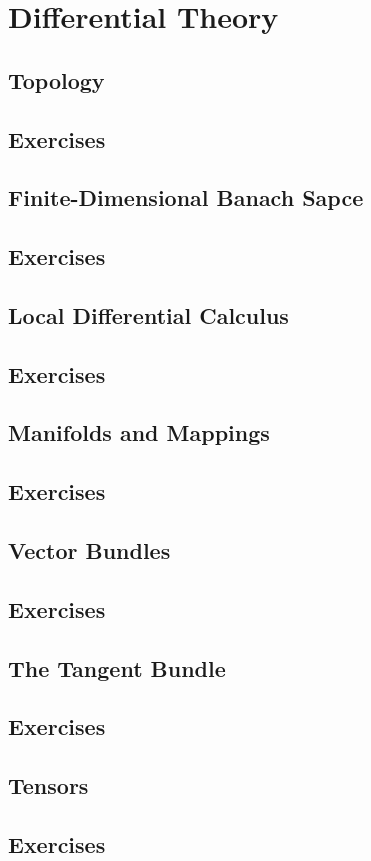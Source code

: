 \chapter{Differential Theory}
\section{Topology}
\section*{Exercises}
\section{Finite-Dimensional Banach Sapce}
\section*{Exercises}
\section{Local Differential Calculus}
\section*{Exercises}
\section{Manifolds and Mappings}
\section*{Exercises}
\section{Vector Bundles}
\section*{Exercises}
\section{The Tangent Bundle}
\section*{Exercises}
\section{Tensors}
\section*{Exercises}